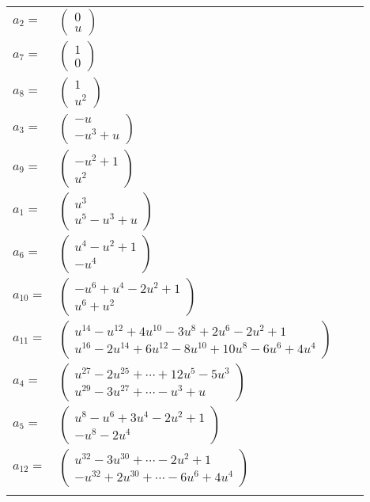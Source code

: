\documentclass[1p]{elsarticle_modified}
\theoremstyle{definition}
\begin{document}
\begin{tabular}{m{7pt} m{180pt} m{7pt} m{180pt} }
\flushright $a_{2}=$&$\begin{pmatrix}0\\u\end{pmatrix}$ \\
\flushright $a_{7}=$&$\begin{pmatrix}1\\0\end{pmatrix}$ \\
\flushright $a_{8}=$&$\begin{pmatrix}1\\u^2\end{pmatrix}$ \\
\flushright $a_{3}=$&$\begin{pmatrix}- u\\- u^3+u\end{pmatrix}$ \\
\flushright $a_{9}=$&$\begin{pmatrix}- u^2+1\\u^2\end{pmatrix}$ \\
\flushright $a_{1}=$&$\begin{pmatrix}u^3\\u^5- u^3+u\end{pmatrix}$ \\
\flushright $a_{6}=$&$\begin{pmatrix}u^4- u^2+1\\- u^4\end{pmatrix}$ \\
\flushright $a_{10}=$&$\begin{pmatrix}- u^6+u^4-2 u^2+1\\u^6+u^2\end{pmatrix}$ \\
\flushright $a_{11}=$&$\begin{pmatrix}u^{14}- u^{12}+4 u^{10}-3 u^8+2 u^6-2 u^2+1\\u^{16}-2 u^{14}+6 u^{12}-8 u^{10}+10 u^8-6 u^6+4 u^4\end{pmatrix}$ \\
\flushright $a_{4}=$&$\begin{pmatrix}u^{27}-2 u^{25}+\cdots+12 u^5-5 u^3\\u^{29}-3 u^{27}+\cdots- u^3+u\end{pmatrix}$ \\
\flushright $a_{5}=$&$\begin{pmatrix}u^8- u^6+3 u^4-2 u^2+1\\- u^8-2 u^4\end{pmatrix}$ \\
\flushright $a_{12}=$&$\begin{pmatrix}u^{32}-3 u^{30}+\cdots-2 u^2+1\\- u^{32}+2 u^{30}+\cdots-6 u^6+4 u^4\end{pmatrix}$\\&\end{tabular}
\end{document}
